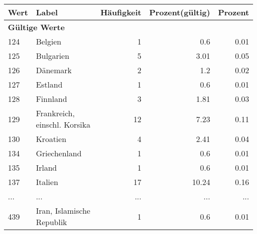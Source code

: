     \begin{longtable}{lXrrr}
     \toprule
     \textbf{Wert} & \textbf{Label} & \textbf{Häufigkeit} & \textbf{Prozent(gültig)} & \textbf{Prozent} \\
     \endhead
     \midrule
     \multicolumn{5}{l}{\textbf{Gültige Werte}}\\
        124 & \multicolumn{1}{X}{Belgien} & %
          \num{1} &
          \num[round-mode=places,round-precision=2]{0.6} &
          \num[round-mode=places,round-precision=2]{0.01} \\
        125 & \multicolumn{1}{X}{Bulgarien} & %
          \num{5} &
          \num[round-mode=places,round-precision=2]{3.01} &
          \num[round-mode=places,round-precision=2]{0.05} \\
        126 & \multicolumn{1}{X}{Dänemark} & %
          \num{2} &
          \num[round-mode=places,round-precision=2]{1.2} &
          \num[round-mode=places,round-precision=2]{0.02} \\
        127 & \multicolumn{1}{X}{Estland} & %
          \num{1} &
          \num[round-mode=places,round-precision=2]{0.6} &
          \num[round-mode=places,round-precision=2]{0.01} \\
        128 & \multicolumn{1}{X}{Finnland} & %
          \num{3} &
          \num[round-mode=places,round-precision=2]{1.81} &
          \num[round-mode=places,round-precision=2]{0.03} \\
        129 & \multicolumn{1}{X}{Frankreich, einschl. Korsika} & %
          \num{12} &
          \num[round-mode=places,round-precision=2]{7.23} &
          \num[round-mode=places,round-precision=2]{0.11} \\
        130 & \multicolumn{1}{X}{Kroatien} & %
          \num{4} &
          \num[round-mode=places,round-precision=2]{2.41} &
          \num[round-mode=places,round-precision=2]{0.04} \\
        134 & \multicolumn{1}{X}{Griechenland} & %
          \num{1} &
          \num[round-mode=places,round-precision=2]{0.6} &
          \num[round-mode=places,round-precision=2]{0.01} \\
        135 & \multicolumn{1}{X}{Irland} & %
          \num{1} &
          \num[round-mode=places,round-precision=2]{0.6} &
          \num[round-mode=places,round-precision=2]{0.01} \\
        137 & \multicolumn{1}{X}{Italien} & %
          \num{17} &
          \num[round-mode=places,round-precision=2]{10.24} &
          \num[round-mode=places,round-precision=2]{0.16} \\
       ... & ... & ... & ... & ... \\
        439 & \multicolumn{1}{X}{Iran, Islamische Republik} & %
          \num{1} &
          \num[round-mode=places,round-precision=2]{0.6} &
          \num[round-mode=places,round-precision=2]{0.01} \\


\end{longtable}
